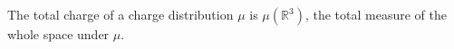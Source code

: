 The total charge of a charge distribution $\mu$ is $\mu(\mathbb{R}^3)$, the total measure of the whole space under $\mu$.
